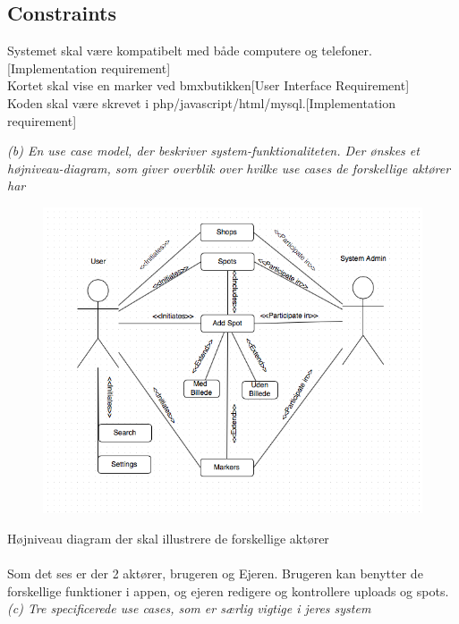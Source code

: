 \documentclass[12pt]{article}
\begin{document}
\subsection*{Constraints}
Systemet skal være kompatibelt med både computere og telefoner.[Implementation requirement]\\
Kortet skal vise en marker ved bmxbutikken[User Interface Requirement]\\
Koden skal være skrevet i php/javascript/html/mysql.[Implementation requirement]\\

\pagebreak

\textit{(b) En use case model, der beskriver system-funktionaliteten. Der ønskes et højniveau-diagram,
som giver overblik over hvilke use cases de forskellige aktører har}\\
\begin{figure}[htb]
\begin{center}
\includegraphics[scale = 0.75]{UM}
\end{center}
\end{figure}

Højniveau diagram der skal illustrere de forskellige aktører\\\\
Som det ses er der 2 aktører, brugeren og Ejeren. Brugeren kan benytter de forskellige funktioner i appen, og ejeren redigere og kontrollere uploads og spots. 
\pagebreak\\
\textit{(c) Tre specificerede use cases, som er særlig vigtige i jeres system}\\
\setlength\parindent{0pt}
\end{document}
